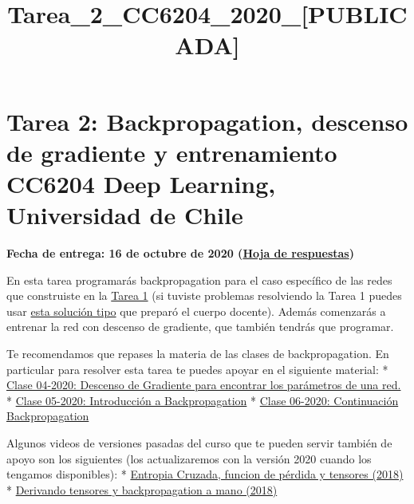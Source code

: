 \documentclass[11pt]{article}
\title{Tarea\_2\_CC6204\_2020\_[PUBLICADA]}
\begin{document}
    
    
    \maketitle
    
    

    
    \hypertarget{tarea-2-backpropagation-descenso-de-gradiente-y-entrenamiento-cc6204-deep-learning-universidad-de-chile}{%
\section{\texorpdfstring{Tarea 2: Backpropagation, descenso de gradiente
y entrenamiento CC6204 Deep Learning, Universidad de
Chile}{Tarea 2: Backpropagation, descenso de gradiente y entrenamiento   CC6204 Deep Learning, Universidad de Chile}}\label{tarea-2-backpropagation-descenso-de-gradiente-y-entrenamiento-cc6204-deep-learning-universidad-de-chile}}

\textbf{Fecha de entrega: 16 de octubre de 2020
(\href{https://colab.research.google.com/drive/1a44G8JIfuaAXmare28dCDT1gvUV1CuDP}{Hoja
de respuestas})}

En esta tarea programarás backpropagation para el caso específico de las
redes que construiste en la
\href{https://colab.research.google.com/drive/1aeuSRjj_kQ_uFEBSJ9bRuyr4G4MY4FAi}{Tarea
1} (si tuviste problemas resolviendo la Tarea 1 puedes usar
\href{https://colab.research.google.com/drive/1whxzPx0jBRu2v1GD-s_VhhYS-w3Tlu9E}{esta
solución tipo} que preparó el cuerpo docente). Además comenzarás a
entrenar la red con descenso de gradiente, que también tendrás que
programar.

Te recomendamos que repases la materia de las clases de backpropagation.
En particular para resolver esta tarea te puedes apoyar en el siguiente
material: * \href{https://www.youtube.com/watch?v=G4dnRSSC6Kw}{Clase
04-2020: Descenso de Gradiente para encontrar los parámetros de una
red.} * \href{https://www.youtube.com/watch?v=1EUAoM1EhM0}{Clase
05-2020: Introducción a Backpropagation} *
\href{https://www.youtube.com/watch?v=Gp2rY7LvTyQ}{Clase 06-2020:
Continuación Backpropagation}

Algunos videos de versiones pasadas del curso que te pueden servir
también de apoyo son los siguientes (los actualizaremos con la versión
2020 cuando los tengamos disponibles): *
\href{https://www.youtube.com/watch?v=lnYAVf1UkU8}{Entropia Cruzada,
funcion de pérdida y tensores (2018)} *
\href{https://www.youtube.com/watch?v=atQHDde309k}{Derivando tensores y
backpropagation a mano (2018)}
\end{document}
